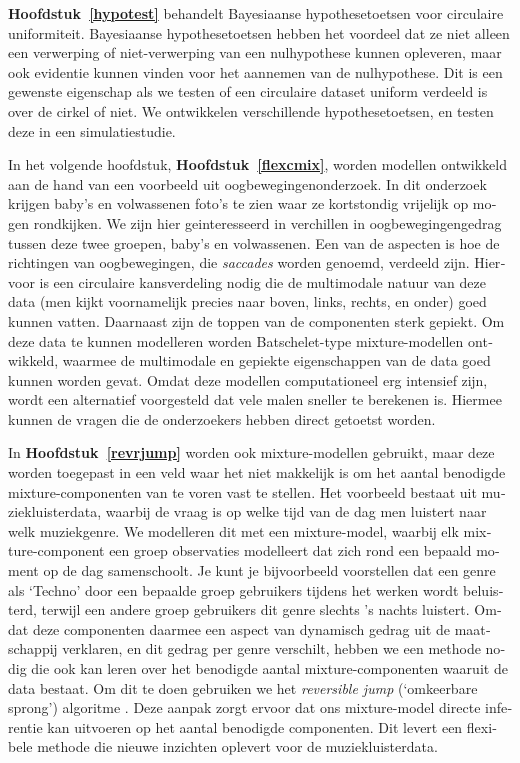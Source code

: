 \documentclass[12pt, a4paper]{book}\usepackage[]{graphicx}\usepackage{xcolor}
\begin{document}
\begin{otherlanguage}{dutch}
\textbf{Hoofdstuk~\ref{hypotest}} behandelt Bayesiaanse hypothesetoetsen voor circulaire uniformiteit. Bayesiaanse hypothesetoetsen hebben het voordeel dat ze niet alleen een verwerping of niet-verwerping van een nulhypothese kunnen opleveren, maar ook evidentie kunnen vinden voor het aannemen van de nulhypothese. Dit is een gewenste eigenschap als we testen of een circulaire dataset uniform verdeeld is over de cirkel of niet. We ontwikkelen verschillende hypothesetoetsen, en testen deze in een simulatiestudie.

In het volgende hoofdstuk, \textbf{Hoofdstuk~\ref{flexcmix}}, worden modellen ontwikkeld aan de hand van een voorbeeld uit oogbewegingenonderzoek. In dit onderzoek krijgen baby's en volwassenen foto's te zien waar ze kortstondig vrijelijk op mogen rondkijken. We zijn hier geinteresseerd in verchillen in oogbewegingengedrag tussen deze twee groepen, baby's en volwassenen. Een van de aspecten is hoe de richtingen van oogbewegingen, die \textit{saccades} worden genoemd, verdeeld zijn. Hiervoor is een circulaire kansverdeling nodig die de multimodale natuur van deze data (men kijkt voornamelijk precies naar boven, links, rechts, en onder) goed kunnen vatten. Daarnaast zijn de toppen van de componenten sterk gepiekt. Om deze data te kunnen modelleren worden Batschelet-type mixture-modellen ontwikkeld, waarmee de multimodale en gepiekte eigenschappen van de data goed kunnen worden gevat. Omdat deze modellen computationeel erg intensief zijn, wordt een alternatief voorgesteld dat vele malen sneller te berekenen is. Hiermee kunnen de vragen die de onderzoekers hebben direct getoetst worden.

In \textbf{Hoofdstuk~\ref{revrjump}} worden ook mixture-modellen gebruikt, maar deze worden toegepast in een veld waar het niet makkelijk is om het aantal benodigde mixture-componenten van te voren vast te stellen. Het voorbeeld bestaat uit muziekluisterdata, waarbij de vraag is op welke tijd van de dag men luistert naar welk muziekgenre. We modelleren dit met een mixture-model, waarbij elk mixture-component een groep observaties modelleert dat zich rond een bepaald moment op de dag samenschoolt. Je kunt je bijvoorbeeld  voorstellen dat een genre als `Techno' door een bepaalde groep gebruikers tijdens het werken wordt beluisterd, terwijl een andere groep gebruikers dit genre slechts 's nachts luistert. Omdat deze componenten daarmee een aspect van dynamisch gedrag uit de maatschappij verklaren, en dit gedrag per genre verschilt, hebben we een methode nodig die ook kan leren over het benodigde aantal mixture-componenten waaruit de data bestaat. Om dit te doen gebruiken we het \textit{reversible jump} (`omkeerbare sprong') algoritme \citep{richardson1997bayesian}. Deze aanpak zorgt ervoor dat ons mixture-model directe inferentie kan uitvoeren op het aantal benodigde componenten. Dit levert een flexibele methode die nieuwe inzichten oplevert voor de muziekluisterdata.


\end{otherlanguage}
\end{document}
